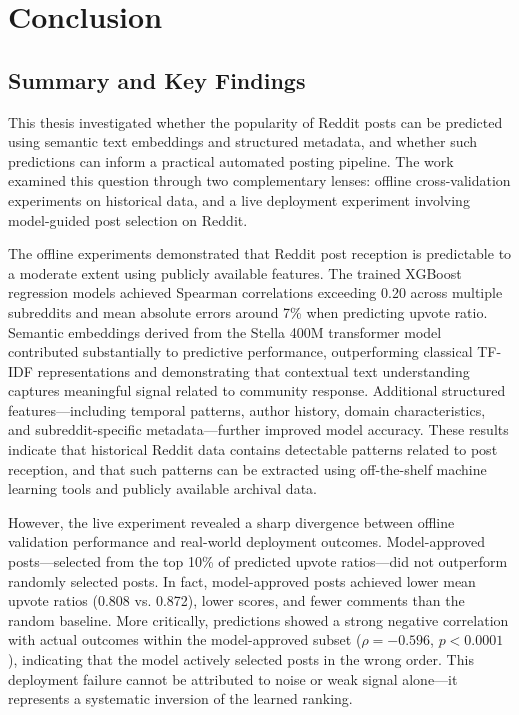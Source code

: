 \chapter{Conclusion}
\label{chap:conclusion}

\section{Summary and Key Findings}

This thesis investigated whether the popularity of Reddit posts can be predicted using semantic text embeddings and structured metadata, and whether such predictions can inform a practical automated posting pipeline. The work examined this question through two complementary lenses: offline cross-validation experiments on historical data, and a live deployment experiment involving model-guided post selection on Reddit.

The offline experiments demonstrated that Reddit post reception is predictable to a moderate extent using publicly available features. The trained XGBoost regression models achieved Spearman correlations exceeding 0.20 across multiple subreddits and mean absolute errors around 7\% when predicting upvote ratio. Semantic embeddings derived from the Stella 400M transformer model contributed substantially to predictive performance, outperforming classical TF-IDF representations and demonstrating that contextual text understanding captures meaningful signal related to community response. Additional structured features—including temporal patterns, author history, domain characteristics, and subreddit-specific metadata—further improved model accuracy. These results indicate that historical Reddit data contains detectable patterns related to post reception, and that such patterns can be extracted using off-the-shelf machine learning tools and publicly available archival data.

However, the live experiment revealed a sharp divergence between offline validation performance and real-world deployment outcomes. Model-approved posts—selected from the top 10\% of predicted upvote ratios—did not outperform randomly selected posts. In fact, model-approved posts achieved lower mean upvote ratios (0.808 vs. 0.872), lower scores, and fewer comments than the random baseline. More critically, predictions showed a strong negative correlation with actual outcomes within the model-approved subset ($\rho = -0.596$, $p < 0.0001$), indicating that the model actively selected posts in the wrong order. This deployment failure cannot be attributed to noise or weak signal alone—it represents a systematic inversion of the learned ranking.

